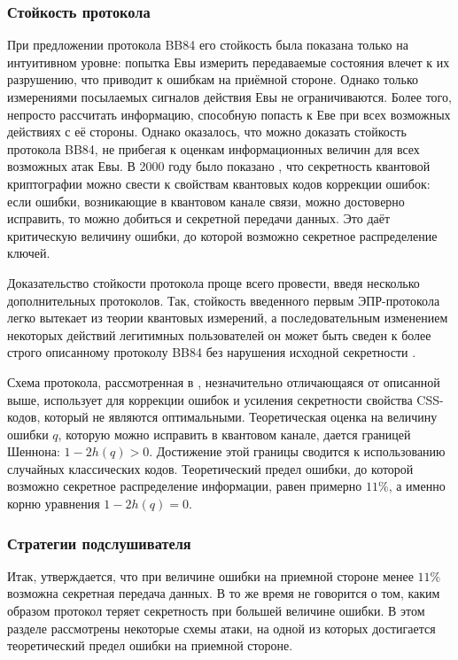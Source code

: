 \subsubsection{Стойкость протокола}
При предложении протокола BB84 его стойкость была показана только на интуитивном уровне: попытка Евы измерить передаваемые состояния влечет к их разрушению, что приводит к ошибкам на приёмной стороне.
Однако только измерениями посылаемых сигналов действия Евы не ограничиваются. Более того, непросто рассчитать информацию, способную попасть к Еве при всех возможных действиях с её стороны. Однако оказалось, что можно доказать стойкость протокола BB84, не прибегая к оценкам информационных величин для всех возможных атак Евы. В 2000 году было показано \cite{shor_bb84_security_proof}, что секретность квантовой криптографии можно свести к свойствам квантовых кодов коррекции ошибок: если ошибки, возникающие в квантовом канале связи, можно достоверно исправить, то можно добиться и секретной передачи данных. Это даёт критическую величину ошибки, до которой возможно секретное распределение ключей. 

Доказательство стойкости протокола проще всего провести, введя несколько дополнительных протоколов. Так, стойкость введенного первым ЭПР-протокола \cite{e91} легко вытекает из теории квантовых измерений, а последовательным изменением некоторых действий легитимных пользователей он может быть сведен к более строго описанному протоколу BB84 без нарушения исходной секретности \cite{lo_chau, protocol_css}.

Схема протокола, рассмотренная в \cite{protocol_css}, незначительно отличающаяся от описанной выше, использует для коррекции ошибок и усиления секретности свойства CSS-кодов, который не являются оптимальными. Теоретическая оценка на величину ошибки $q$, которую можно исправить в квантовом канале, дается границей Шеннона: $1-2h(q) > 0$. 
Достижение этой границы сводится к использованию случайных классических кодов. Теоретический предел ошибки, до которой возможно секретное распределение информации, равен примерно $11\%$, а именно корню уравнения $1 - 2h(q) = 0$.

\subsubsection{Стратегии подслушивателя}
Итак, утверждается, что при величине ошибки на приемной стороне менее $11\%$ возможна секретная передача данных. В то же время не говорится о том, каким образом протокол теряет секретность при большей величине ошибки. В этом разделе рассмотрены некоторые схемы атаки, на одной из которых достигается теоретический предел ошибки на приемной стороне.
